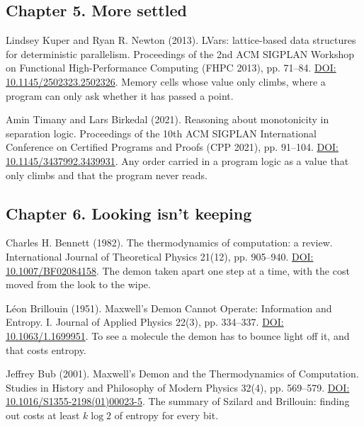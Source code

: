 \documentclass[11pt,twoside]{article}
\theoremstyle{thielethm}
\theoremstyle{thieledef}
\theoremstyle{thieledef}
\theoremstyle{thieledef}
\theoremstyle{thielethm}
\theoremstyle{thieleobs}
\theoremstyle{thielethm}
\begin{document}
\subsection*{Chapter 5. More settled}

\noindent Lindsey Kuper and Ryan R. Newton (2013). LVars: lattice-based data structures for deterministic parallelism. Proceedings of the 2nd ACM SIGPLAN Workshop on Functional High-Performance Computing (FHPC 2013), pp. 71--84. \href{https://doi.org/10.1145/2502323.2502326}{DOI: 10.1145/2502323.2502326}. Memory cells whose value only climbs, where a program can only ask whether it has passed a point.
\par\medskip

\noindent Amin Timany and Lars Birkedal (2021). Reasoning about monotonicity in separation logic. Proceedings of the 10th ACM SIGPLAN International Conference on Certified Programs and Proofs (CPP 2021), pp. 91--104. \href{https://doi.org/10.1145/3437992.3439931}{DOI: 10.1145/3437992.3439931}. Any order carried in a program logic as a value that only climbs and that the program never reads.
\par\medskip

\subsection*{Chapter 6. Looking isn't keeping}

\noindent Charles H. Bennett (1982). The thermodynamics of computation: a review. International Journal of Theoretical Physics 21(12), pp. 905--940. \href{https://doi.org/10.1007/BF02084158}{DOI: 10.1007/BF02084158}. The demon taken apart one step at a time, with the cost moved from the look to the wipe.
\par\medskip

\noindent L\'eon Brillouin (1951). Maxwell's Demon Cannot Operate: Information and Entropy. I. Journal of Applied Physics 22(3), pp. 334--337. \href{https://doi.org/10.1063/1.1699951}{DOI: 10.1063/1.1699951}. To see a molecule the demon has to bounce light off it, and that costs entropy.
\par\medskip

\noindent Jeffrey Bub (2001). Maxwell's Demon and the Thermodynamics of Computation. Studies in History and Philosophy of Modern Physics 32(4), pp. 569--579. \href{https://doi.org/10.1016/S1355-2198(01)00023-5}{DOI: 10.1016/S1355-2198(01)00023-5}. The summary of Szilard and Brillouin: finding out costs at least $k \log 2$ of entropy for every bit.
\par\medskip
\end{document}
